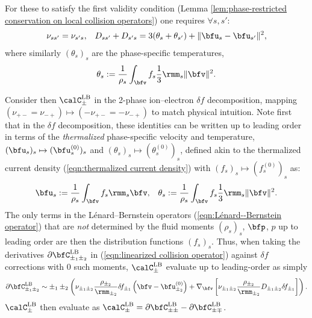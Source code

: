     For these to satisfy the first validity condition (Lemma \ref{lem:phase-restricted conservation on local collision operators}) one requires $\forall s, s'$:
    \begin{align}
        \nu_{ss'}          =  \nu_{s's},  &&
        D_{ss'} + D_{s's}  =  3(\theta_{s} + \theta_{s'}) + \|\bfu_{s} - \bfu_{s'}\|^{2},
    \end{align}
    where similarly $(\theta_{s})_{s}$ are the phase-specific temperatures,
    \begin{equation}
        \theta_{s}  :=  \frac{1}{\rho_{s}}\int_{\bfv}f_{s}\frac{1}{3}\rmm_{s}\|\bfv\|^{2}.
    \end{equation}
    
    Consider then $\calC_{\pm}^{\rm LB}$ in the 2-phase ion--electron $\delta\!f$ decomposition, mapping $(\nu_{+-} = \nu_{-+})  \mapsto  (- \nu_{+-} = - \nu_{-+})$ to match physical intuition. Note first that in the $\delta\!f$ decomposition, these identities can be written up to leading order in terms of the \emph{thermalized} phase-specific velocity and temperature, $(\bfu_{s})_{s}  \mapsto  (\bfu_{s}^{(0)})_{s}$ and $(\theta_{s})_{s}  \mapsto  (\theta_{s}^{(0)})_{s}$, defined akin to the thermalized current density (\ref{eqn:thermalized current density}) with $(f_{s})_{s}  \mapsto  (f_{s}^{(0)})_{s}$ as:
    \begin{align}
        \bfu_{s}    :=  \frac{1}{\rho_{s}}\int_{\bfv}f_{s}\rmm_{s}\bfv,  &&
        \theta_{s}  :=  \frac{1}{\rho_{s}}\int_{\bfv}f_{s}\frac{1}{3}\rmm_{s}\|\bfv\|^{2}.
    \end{align}
    The only terms in the Lénard--Bernstein operators (\ref{eqn:Lénard--Bernstein operator}) that are \emph{not} determined by the fluid moments $(\rho_{s})_{s}$, $\bfp$, $p$ up to leading order are then the distribution functions $(f_{s})_{s}$. Thus, when taking the derivatives $\partial\bfC_{\pm_{1}\pm_{2}}^{\rm LB}$ in (\ref{eqn:linearized collision operator}) against $\delta\!f$ corrections with 0 such moments, $\calC_{\pm}^{\rm LB}$ evaluate up to leading-order as simply
    \begin{equation}
        \partial\bfC_{\pm_{1}\pm_{2}}^{\rm LB}  \sim  \pm_{1}\pm_{2}\left(\nu_{\pm_{1}\pm_{2}}\frac{\rho_{\pm_{2}}}{\rmm_{\pm_{2}}}\delta\!f_{\pm_{1}}\left(\bfv - \bfu_{\pm_{2}}^{(0)}\right) + \nabla_{\bfv}\left[\nu_{\pm_{1}\pm_{2}}\frac{\rho_{\pm_{2}}}{\rmm_{\pm_{2}}}D_{\pm_{1}\pm_{2}}\delta\!f_{\pm_{1}}\right]\right).
    \end{equation}
    $\calC_{\pm}^{\rm LB}$ then evaluate as $\calC_{\pm}^{\rm LB}  =  \partial\bfC_{\pm\pm}^{\rm LB} - \partial\bfC_{\pm\mp}^{\rm LB}$.
    
